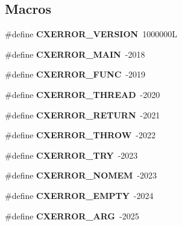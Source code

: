 \subsection*{Macros}
\begin{DoxyCompactItemize}
\item 
\mbox{\label{a00008_a5b8d52f060c8908fb025bd16201fbf49}} 
\#define {\bfseries C\+X\+E\+R\+R\+O\+R\+\_\+\+V\+E\+R\+S\+I\+ON}~1000000L
\item 
\mbox{\label{a00008_ab600a2597512889da741a03cab3797e8}} 
\#define {\bfseries C\+X\+E\+R\+R\+O\+R\+\_\+\+M\+A\+IN}~-\/2018
\item 
\mbox{\label{a00008_ad036caf4caff7b0dc9d41887337646f2}} 
\#define {\bfseries C\+X\+E\+R\+R\+O\+R\+\_\+\+F\+U\+NC}~-\/2019
\item 
\mbox{\label{a00008_a35bddeba7e57335e72010a3bfd324a71}} 
\#define {\bfseries C\+X\+E\+R\+R\+O\+R\+\_\+\+T\+H\+R\+E\+AD}~-\/2020
\item 
\mbox{\label{a00008_ae6621b332130a649e1e1684b3e1082f3}} 
\#define {\bfseries C\+X\+E\+R\+R\+O\+R\+\_\+\+R\+E\+T\+U\+RN}~-\/2021
\item 
\mbox{\label{a00008_a1ec6bc7be0b7c5985f97540d00c84de2}} 
\#define {\bfseries C\+X\+E\+R\+R\+O\+R\+\_\+\+T\+H\+R\+OW}~-\/2022
\item 
\mbox{\label{a00008_a67aba3619760b88b100127a53a41cc16}} 
\#define {\bfseries C\+X\+E\+R\+R\+O\+R\+\_\+\+T\+RY}~-\/2023
\item 
\mbox{\label{a00008_a3c7905fc6441e714dbf9c9ad464a59c7}} 
\#define {\bfseries C\+X\+E\+R\+R\+O\+R\+\_\+\+N\+O\+M\+EM}~-\/2023
\item 
\mbox{\label{a00008_ad20217630427985309eaaa7e5db79af6}} 
\#define {\bfseries C\+X\+E\+R\+R\+O\+R\+\_\+\+E\+M\+P\+TY}~-\/2024
\item 
\mbox{\label{a00008_a4ccd3f7805126c885e383fb35abf57f6}} 
\#define {\bfseries C\+X\+E\+R\+R\+O\+R\+\_\+\+A\+RG}~-\/2025
\item 
\mbox{\label{a00008_a19b6c0e8af74f2867b458cf68be6eb23}} 

\end{DoxyCompactItemize}
